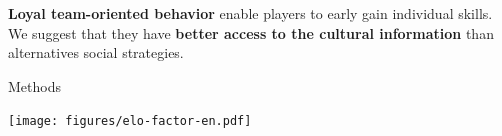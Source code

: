 \documentclass[a0]{a0poster}
\begin{document}
\begin{paracol}{3}
\begin{justify}
 \textbf{Loyal team-oriented behavior} enable players to early gain individual skills. We suggest that they have \textbf{better access to the cultural information} than alternatives social strategies.
 \end{justify}     
 
 \switchcolumn
{\fontsize{55}{0}\selectfont Methods }
\vspace{0.5cm}

\begin{center}
\texttt{[image: figures/elo-factor-en.pdf]} 
\end{center}


 
 \end{paracol}

 
\end{document}
